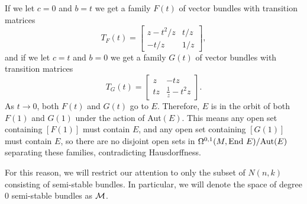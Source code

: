 	If we let $c=0$ and $b=t$ we get a family $F(t)$ of vector bundles with transition matrices
	\begin{equation*}
	T_{F}(t) = \begin{bmatrix}
	z-t^2/z & t/z\\
	-t/z & 1/z
	\end{bmatrix},
	\end{equation*}
	and if we let $c=t$ and $b=0$ we get a family $G(t)$ of vector bundles with transition matrices
	\begin{equation*}
	T_{G}(t) = \begin{bmatrix}
	z & -tz\\
	tz & \frac{1}{z}-t^2 z
	\end{bmatrix}.
	\end{equation*}
	As $t\to 0$, both $F(t)$ and $G(t)$ go to $E$. Therefore, $E$ is in the orbit of both $F(1)$ and $G(1)$ under the action of Aut$(E)$. This means any open set containing $[F(1)]$ must contain $E$, and any open set containing $[G(1)]$ must contain $E$, so there are no disjoint open sets in $\Omega^{0,1}(M,\text{End } E)/\text{Aut}(E)$ separating these families, contradicting Hausdorffness.
	
	For this reason, we will restrict our attention to only the subset of $N(n,k)$ consisting of semi-stable bundles. In particular, we will denote the space of degree $0$ semi-stable bundles as $\mathcal{M}$. 
	
